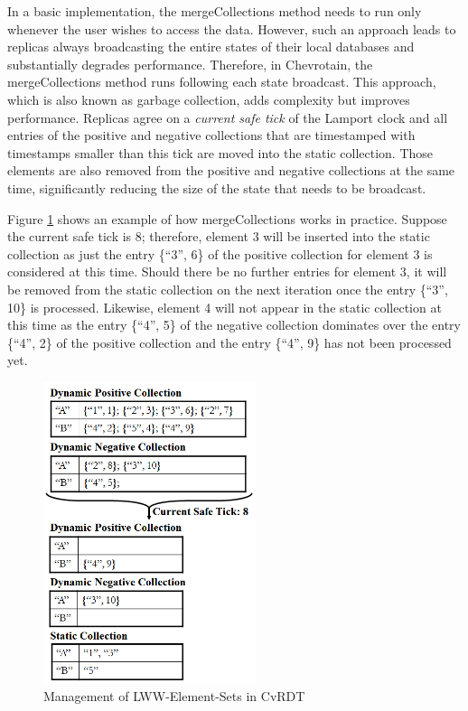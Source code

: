 \documentclass[sigconf,nonacm,10pt]{acmart}
\begin{document}
In a basic implementation, the mergeCollections method needs to run only whenever the user wishes to access the data. However, such an approach leads to replicas always broadcasting the entire states of their local databases and substantially degrades performance. Therefore, in Chevrotain, the mergeCollections method runs following each state broadcast. This approach, which is also known as garbage collection, adds complexity but improves performance. Replicas agree on a \emph{current safe tick} of the Lamport clock and all entries of the positive and negative collections that are timestamped with timestamps smaller than this tick are moved into the static collection. Those elements are also removed from the positive and negative collections at the same time, significantly reducing the size of the state that needs to be broadcast.

Figure \ref{fig:cvrdt2} shows an example of how mergeCollections works in practice. Suppose the current safe tick is 8; therefore, element 3 will be inserted into the static collection as just the entry \{``3'', 6\} of the positive collection for element 3 is considered at this time. Should there be no further entries for element 3, it will be removed from the static collection on the next iteration once the entry \{``3'', 10\} is processed. Likewise, element 4 will not appear in the static collection at this time as the entry \{``4'', 5\} of the negative collection dominates over the entry \{``4'', 2\} of the positive collection and the entry \{``4'', 9\} has not been processed yet.

\begin{figure}[h]
  \centering
  \includegraphics[width=6.25cm]{Fig3CvRDT2}
  \caption{Management of LWW-Element-Sets in CvRDT}
  \label{fig:cvrdt2}
\end{figure}
\end{document}
